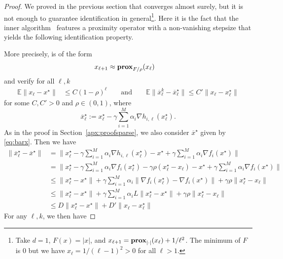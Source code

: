 \begin{proof}
We proved in the previous section that \recoalgo converges almost surely, but it is not enough to guarantee identification in general\footnote{Take $d=1$, $F(x) = |x|$, and $x_{\ell+1} = \mathbf{prox}_{|\cdot|}(x_\ell) + 1/\ell^2$. The minimum of $F$ is $0$ but we have $x_\ell = 1/(\ell-1)^2>0$ for all $\ell>1$.}. Here it is the fact that the inner algorithm \spyI~features a proximity operator with a non-vanishing stepsize that yields the following identification property. 

More precisely, \recoalgo is of the form 
\begin{align*}
    x_{\ell+1} &\approx \mathbf{prox}_{F/\rho}(x_\ell)
\end{align*}
and verify for all $\ell,k$
\begin{align*}
    \mathbb{E} \|x_{\ell} - x^\star \| &\leq C (1-\rho)^\ell
    \qquad\text{and}\qquad
    \mathbb{E} \|\overline{x}^k_{\ell} - \overline{x}_\ell^\star \| \leq C'  \|x_{\ell} - x_\ell^\star \| 
\end{align*}
for some $C,C'>0$ and $\rho\in(0,1)$, where 
$$
\overline{x}_\ell^\star :=  {x}_\ell^\star - \gamma \sum_{i=1}^M \alpha_i \nabla h_{i,\ell}({x}_\ell^\star).
$$
As in the proof in Section~\ref{apx:proofsparse}, we also consider $\overline{x}^\star$ given by \eqref{eq:barx}. 
Then we have
\begin{align*}
    \|\overline{x}_\ell^\star - \overline{x}^\star\| &=    \|{x}_\ell^\star - \gamma \sum_{i=1}^M \alpha_i \nabla h_{i,\ell}({x}_\ell^\star) - {x}^\star + \gamma \sum_{i=1}^M \alpha_i \nabla f_i({x}^\star) \| \\ 
    &=  \|{x}_\ell^\star - \gamma \sum_{i=1}^M \alpha_i \nabla f_{i}({x}_\ell^\star) - \gamma \rho ({x}_\ell^\star - {x}_\ell) - {x}^\star + \gamma \sum_{i=1}^M \alpha_i \nabla f_i({x}^\star) \| \\ 
    &\leq  \|{x}_\ell^\star - {x}^\star\| + \gamma \sum_{i=1}^M \alpha_i  \|\nabla f_i({x}_\ell^\star) - \nabla f_i({x}^\star)\| + \gamma \rho \|{x}_\ell^\star - {x}_\ell\| \\
    &\leq  \|{x}_\ell^\star - {x}^\star\| + \gamma \sum_{i=1}^M \alpha_i L \|{x}_\ell^\star - {x}^\star\| + \gamma \rho \|{x}_\ell^\star - {x}_\ell\| \\
    &\leq  D \|{x}_\ell^\star - {x}^\star\|  + D' \|x_\ell - {x}^\star_\ell\|
\end{align*}
For any $\ell,k$, we then have

\end{proof}

